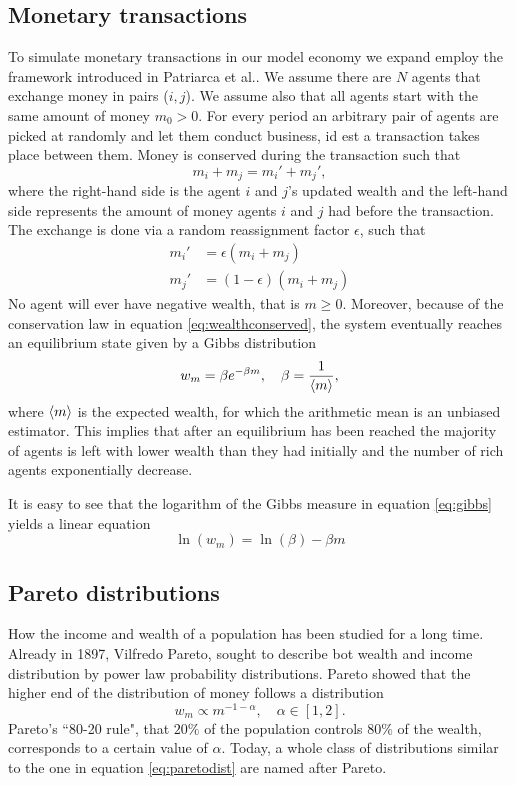 \documentclass[10pt, a4paper]{amsart}
\begin{document}
\subsection{Monetary transactions}
To simulate monetary transactions in our model economy we expand employ the framework introduced in Patriarca et al.\cite{Patriarca}. We assume there are $N$ agents that exchange money in pairs ($i,j$). We assume also that all agents start with the same amount of money $m_0>0$. For every period an arbitrary pair of agents are picked at randomly and let them conduct business, id est a transaction takes place between them. Money is conserved during the transaction such that
\begin{equation}
\label{eq:wealthconserved}
m_i + m_j = m_i' + m_j',
\end{equation}
where the right-hand side is the agent $i$ and $j$'s updated wealth and the left-hand side represents the amount of money agents $i$ and $j$ had before the transaction. The exchange is done via a random reassignment factor $\epsilon$, such that
\begin{align}
m_i' &= \epsilon (m_i + m_j) \\
m_j' &= (1 - \epsilon) (m_i + m_j)
\end{align}
No agent will ever have negative wealth, that is $m \geq 0$. Moreover, because of the conservation law in equation \ref{eq:wealthconserved}, the system eventually reaches an equilibrium state given by a Gibbs distribution
\begin{equation}
\label{eq:gibbs}
w_m = \beta e^{-\beta m}, \quad \beta = \frac{1}{\ev{m}},
\end{equation}
where $\ev{m}$ is the expected wealth, for which the arithmetic mean is an unbiased estimator. This implies that after an equilibrium has been reached the majority of agents is left with lower wealth than they had initially and
the number of rich agents exponentially decrease.

It is easy to see that the logarithm of the Gibbs measure in equation \ref{eq:gibbs} yields a linear equation
\begin{equation}
\label{eq:lingibbs}
\ln(w_m)=\ln(\beta) - \beta m
\end{equation}

\subsection{Pareto distributions}
How the income and wealth of a population has been studied for a long time. Already in 1897, Vilfredo Pareto, sought to describe bot wealth and income distribution by power law probability distributions\cite{Pareto}. Pareto showed that the higher end of the distribution of money follows a distribution
\begin{equation}
\label{eq:paretodist}
w_m \propto m^{-1-\alpha}, \quad \alpha \in [1,2].
\end{equation}
Pareto's ``80-20 rule", that $20\%$ of the population controls $80\%$ of the wealth, corresponds to a certain value of $\alpha$. Today, a whole class of distributions similar to the one in equation \ref{eq:paretodist} are named after Pareto\cite{Arnold}.
\end{document}
